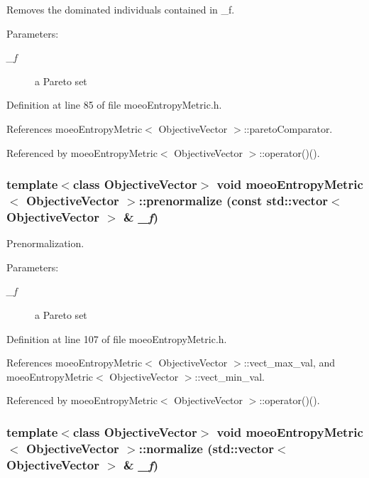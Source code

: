 Removes the dominated individuals contained in \_\-f. 

\begin{Desc}
\item[Parameters:]
\begin{description}
\item[{\em \_\-f}]a Pareto set \end{description}
\end{Desc}


Definition at line 85 of file moeo\-Entropy\-Metric.h.

References moeo\-Entropy\-Metric$<$ Objective\-Vector $>$::pareto\-Comparator.

Referenced by moeo\-Entropy\-Metric$<$ Objective\-Vector $>$::operator()().
\subsubsection{\setlength{\rightskip}{0pt plus 5cm}template$<$class Objective\-Vector$>$ void \bf{moeo\-Entropy\-Metric}$<$ Objective\-Vector $>$::prenormalize (const std::vector$<$ Objective\-Vector $>$ \& {\em \_\-f})\hspace{0.3cm}{\tt  [inline, private]}}\label{classmoeoEntropyMetric_51dd04bdd0ac6315f4f5956fb726cec1}


Prenormalization. 

\begin{Desc}
\item[Parameters:]
\begin{description}
\item[{\em \_\-f}]a Pareto set \end{description}
\end{Desc}


Definition at line 107 of file moeo\-Entropy\-Metric.h.

References moeo\-Entropy\-Metric$<$ Objective\-Vector $>$::vect\_\-max\_\-val, and moeo\-Entropy\-Metric$<$ Objective\-Vector $>$::vect\_\-min\_\-val.

Referenced by moeo\-Entropy\-Metric$<$ Objective\-Vector $>$::operator()().
\subsubsection{\setlength{\rightskip}{0pt plus 5cm}template$<$class Objective\-Vector$>$ void \bf{moeo\-Entropy\-Metric}$<$ Objective\-Vector $>$::normalize (std::vector$<$ Objective\-Vector $>$ \& {\em \_\-f})\hspace{0.3cm}{\tt  [inline, private]}}\label{classmoeoEntropyMetric_2ed5771c3c611634b415f4be48cad172}


